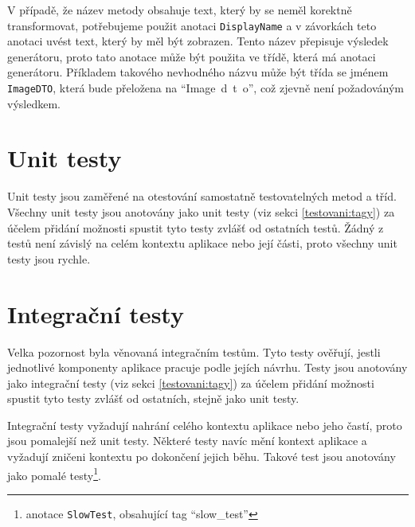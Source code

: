     V případě, že název metody obsahuje text, který by se neměl korektně transformovat, potřebujeme použit anotaci \verb|DisplayName| a v závorkách teto anotaci uvést text, který by měl být zobrazen. Tento název přepisuje výsledek generátoru, proto tato anotace může být použita ve třídě, která má anotaci generátoru. Příkladem takového nevhodného názvu může být třída se jménem \verb|ImageDTO|, která bude přeložena na \enquote{Image~d~t~o}, což zjevně není požadováným výsledkem.
    
\section{Unit testy}\label{testovani:unit}
    Unit testy jsou zaměřené na otestování samostatně testovatelných metod a tříd. Všechny unit testy jsou anotovány jako unit testy (viz sekci \ref{testovani:tagy}) za účelem přidání možnosti spustit tyto testy zvlášť od ostatních testů. Žádný z testů není závislý na celém kontextu aplikace nebo její části, proto všechny unit testy jsou rychle.
    
\section{Integrační testy}\label{testovani:intergacni}
    Velka pozornost byla věnovaná integračním testům. Tyto testy ověřují, jestli jednotlivé komponenty aplikace pracuje podle jejích návrhu. Testy jsou anotovány jako integrační testy (viz sekci \ref{testovani:tagy}) za účelem přidání možnosti spustit tyto testy zvlášť od ostatních, stejně jako unit testy. 
    
    Integrační testy vyžadují nahrání celého kontextu aplikace nebo jeho častí, proto jsou pomalejší než unit testy. Některé testy navíc mění kontext aplikace a vyžadují zničeni kontextu po dokončení jejich běhu. Takové test jsou anotovány jako pomalé testy\footnote{anotace \texttt{SlowTest}, obsahující tag \enquote{slow\_test}}.
    
